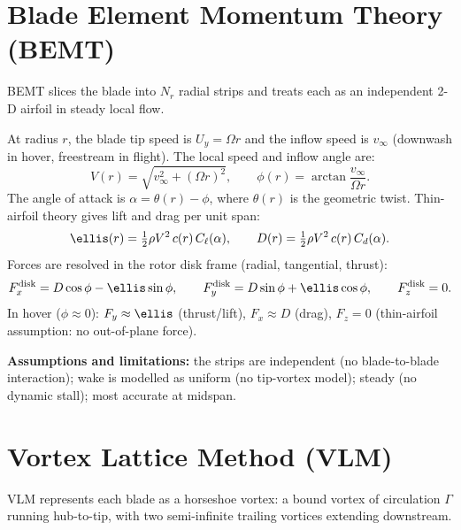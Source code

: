 \documentclass{QD_2026}
\begin{document}
\section{Blade Element Momentum Theory (BEMT)}
\label{sec:bemt}

BEMT slices the blade into $N_r$ radial strips and treats each as an
independent 2-D airfoil in steady local flow.

At radius $r$, the blade tip speed is $U_y = \Omega r$ and the inflow
speed is $v_\infty$ (downwash in hover, freestream in flight).
The local speed and inflow angle are:
%
\begin{equation}
  V(r) = \sqrt{v_\infty^2 + (\Omega r)^2}, \qquad
  \phi(r) = \arctan\frac{v_\infty}{\Omega r}.
\end{equation}
%
The angle of attack is $\alpha = \theta(r) - \phi$, where $\theta(r)$ is the
geometric twist.  Thin-airfoil theory gives lift and drag per unit span:
%
\begin{equation}
  \ellis(r) = \tfrac12\rho V^2\,c(r)\,C_\ell(\alpha), \qquad
  D(r)     = \tfrac12\rho V^2\,c(r)\,C_d(\alpha).
\end{equation}
%
Forces are resolved in the rotor disk frame (radial, tangential, thrust):
%
\begin{equation}
  F_x^{\mathrm{disk}} = D\cos\phi - \ellis\sin\phi, \qquad
  F_y^{\mathrm{disk}} = D\sin\phi + \ellis\cos\phi, \qquad
  F_z^{\mathrm{disk}} = 0.
\end{equation}
%
In hover ($\phi\approx 0$): $F_y \approx \ellis$ (thrust/lift),
$F_x \approx D$ (drag), $F_z = 0$ (thin-airfoil assumption: no out-of-plane force).

\textbf{Assumptions and limitations:}
the strips are independent (no blade-to-blade interaction);
wake is modelled as uniform (no tip-vortex model);
steady (no dynamic stall);
most accurate at midspan.

\section{Vortex Lattice Method (VLM)}
\label{sec:vlm}

VLM represents each blade as a horseshoe vortex: a bound vortex of circulation
$\Gamma$ running hub-to-tip, with two semi-infinite trailing vortices
extending downstream.
\end{document}
